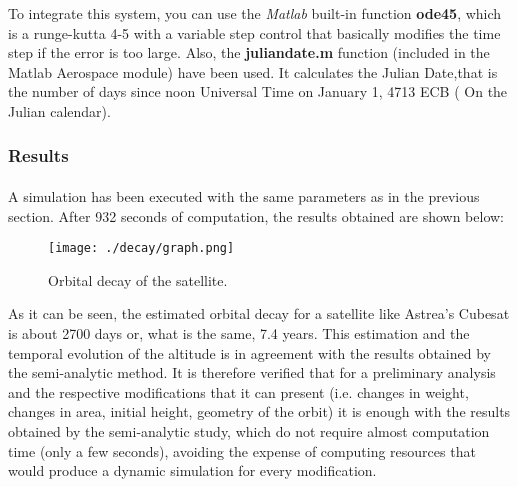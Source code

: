 To integrate this system, you can use the \emph{Matlab} built-in function \textbf{ode45}, which is a runge-kutta 4-5 with a variable step control that basically modifies the time step if the error is too large.
Also, the \textbf{juliandate.m} function (included in the Matlab Aerospace module) have been used. It calculates the Julian Date,that is the number of days since noon Universal Time on January 1, 4713 ECB ( On the Julian calendar).

\subsubsection{Results}
\paragraph{}A simulation has been executed with the same parameters as in the previous section. After 932 seconds of computation, the results obtained are shown below:

\begin{figure}[H]
\centering
\texttt{[image: ./decay/graph.png]}
\caption{Orbital decay of the satellite.}
\label{fig:COE}
\end{figure}

As it can be seen, the estimated orbital decay for a satellite like Astrea's Cubesat is about 2700 days or, what is the same, 7.4 years. This estimation and the temporal evolution of the altitude is in agreement with the results obtained by the semi-analytic method. It is therefore verified that for a preliminary analysis and the respective modifications that it can present (i.e. changes in weight, changes in area, initial height, geometry of the orbit) it is enough with the results obtained by the semi-analytic study, which do not require almost computation time (only a few seconds), avoiding the expense of computing resources that would produce a dynamic simulation for every modification.
